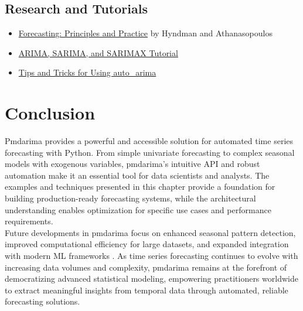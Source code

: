 \subsection{Research and Tutorials}
\begin{itemize}
	\item \href{https://otexts.com/fpp2/}{Forecasting: Principles and Practice} by Hyndman and Athanasopoulos
	\item \href{https://towardsdatascience.com/time-series-forecasting-with-arima-sarima-and-sarimax-ee61099e78f6}{ARIMA, SARIMA, and SARIMAX Tutorial} \cite{TowardsDataScience:2023}
	\item \href{https://alkaline-ml.com/pmdarima/tips_and_tricks.html}{Tips and Tricks for Using auto\_arima}
\end{itemize}

\section{Conclusion}
\label{sec:conclusion}

Pmdarima provides a powerful and accessible solution for automated time series forecasting with Python. From simple univariate forecasting to complex seasonal models with exogenous variables, pmdarima's intuitive API and robust automation make it an essential tool for data scientists and analysts. The examples and techniques presented in this chapter provide a foundation for building production-ready forecasting systems, while the architectural understanding enables optimization for specific use cases and performance requirements.\\

Future developments in pmdarima focus on enhanced seasonal pattern detection, improved computational efficiency for large datasets, and expanded integration with modern ML frameworks \cite{Smith:2023}. As time series forecasting continues to evolve with increasing data volumes and complexity, pmdarima remains at the forefront of democratizing advanced statistical modeling, empowering practitioners worldwide to extract meaningful insights from temporal data through automated, reliable forecasting solutions.